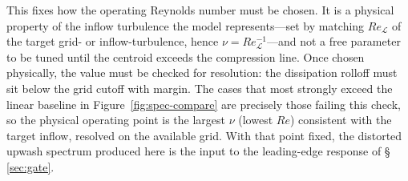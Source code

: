 This fixes how the operating Reynolds number must be chosen. It is a physical
property of the inflow turbulence the model represents---set by matching
$Re_{\mathcal{L}}$ of the target grid- or inflow-turbulence, hence
$\nu=Re_{\mathcal{L}}^{-1}$---and not a free parameter to be tuned until the
centroid exceeds the compression line. Once chosen physically, the value must
be checked for resolution: the dissipation rolloff must sit below the grid
cutoff with margin. The cases that most strongly exceed the linear baseline
in Figure~\ref{fig:spec-compare} are precisely those failing this check, so
the physical operating point is the largest $\nu$ (lowest $Re$) consistent
with the target inflow, resolved on the available grid. With that point
fixed, the distorted upwash spectrum produced here is the input to the
leading-edge response of \S\,\ref{sec:gate}.
